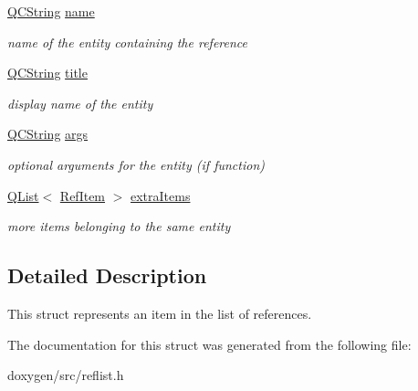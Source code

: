 \begin{DoxyCompactItemize}
\mbox{\label{struct_ref_item_a1235c4acaa9aa9bfece34c6d7f654ef0}} 
\mbox{\hyperlink{class_q_c_string}{Q\+C\+String}} \mbox{\hyperlink{struct_ref_item_a1235c4acaa9aa9bfece34c6d7f654ef0}{name}}
\begin{DoxyCompactList}\small\item\em name of the entity containing the reference \end{DoxyCompactList}\item 
\mbox{\label{struct_ref_item_a5160b8acde58f43ebfc2842281591acd}} 
\mbox{\hyperlink{class_q_c_string}{Q\+C\+String}} \mbox{\hyperlink{struct_ref_item_a5160b8acde58f43ebfc2842281591acd}{title}}
\begin{DoxyCompactList}\small\item\em display name of the entity \end{DoxyCompactList}\item 
\mbox{\label{struct_ref_item_abe88c74f88bcacf9fa2d16c797742910}} 
\mbox{\hyperlink{class_q_c_string}{Q\+C\+String}} \mbox{\hyperlink{struct_ref_item_abe88c74f88bcacf9fa2d16c797742910}{args}}
\begin{DoxyCompactList}\small\item\em optional arguments for the entity (if function) \end{DoxyCompactList}\item 
\mbox{\label{struct_ref_item_ab530bdf51cf559d443a6183a93fe37b6}} 
\mbox{\hyperlink{class_q_list}{Q\+List}}$<$ \mbox{\hyperlink{struct_ref_item}{Ref\+Item}} $>$ \mbox{\hyperlink{struct_ref_item_ab530bdf51cf559d443a6183a93fe37b6}{extra\+Items}}
\begin{DoxyCompactList}\small\item\em more items belonging to the same entity \end{DoxyCompactList}\end{DoxyCompactItemize}


\subsection{Detailed Description}
This struct represents an item in the list of references. 

The documentation for this struct was generated from the following file\+:\begin{DoxyCompactItemize}
\item 
doxygen/src/reflist.\+h\end{DoxyCompactItemize}
